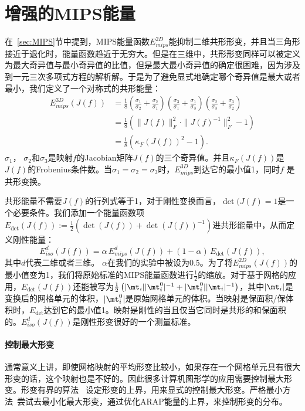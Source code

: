 \section{增强的MIPS能量} \label{sec:AMIPS}
在~\ref{sec:MIPS}节中提到，MIPS能量函数$E_{mips}^{2D}$能抑制二维共形形变，并且当三角形接近于退化时，能量函数趋近于无穷大。但是在三维中，共形形变同样可以被定义为最大奇异值与最小奇异值的比值，但是最大最小奇异值的确定很困难，因为涉及到一元三次多项式方程的解析解。于是为了避免显式地确定哪个奇异值是最大或者最小，我们定义了一个对称式的共形能量：
\begin{align*}\label{MIPS:mips_3D}
E^{3D}_{mips}(J(f)) &=\frac{1}{8}\left(\frac{\sigma_{1}}{\sigma_{2}} + \frac{\sigma_{2}}{\sigma_{1}}\right)\left(\frac{\sigma_{3}}{\sigma_{1}} + \frac{\sigma_{1}}{\sigma_{3}}\right)\left(\frac{\sigma_{2}}{\sigma_{3}} + \frac{\sigma_{3}}{\sigma_{2}}\right)\\
&= \frac{1}{8}\left(\| J(f) \|^2_{F} \cdot \| J(f)^{-1} \|^2_{F} - 1\right) \\
& = \frac{1}{8}(\kappa_F(J(f))^2 -1).
\end{align*}
$\sigma_{1}$， $\sigma_{2}$和$\sigma_{3}$是映射$f$的Jacobian矩阵$J(f)$的三个奇异值。并且$\kappa_F(J(f))$是$J(f)$的Frobenius条件数。当$\sigma_{1}=\sigma_{2}=\sigma_{3}$时，$E^{3D}_{mips}$到达它的最小值1，同时$f$ 是共形变换。

共形能量不需要$J(f)$的行列式等于1，对于刚性变换而言，$\det(J(f) = 1$是一个必要条件。我们添加一个能量函数项$E_{\det}(J(f)) :=\frac{1}{2}(\det(J(f))+\det(J(f))^{-1})$进共形能量中，从而定义刚性能量：
\begin{equation*}
E^{d}_{iso}(J(f)) = \alpha\, E^{d}_{mips}(J(f)) + (1 - \alpha)\, E_{\det}(J(f)),
\end{equation*}
其中$d$代表二维或者三维。 $\alpha$在我们的实验中被设为0.5。为了将$E^{2D}_{mips}(J(f))$的最小值变为1，我们将原始标准的MIPS能量函数进行$\frac{1}{2}$的缩放。对于基于网格的应用，$E_{\det}(J(f))$还能被写为$\frac{1}{2}\left(|\mt_i||\mt^0_i|^{-1} + |\mt^0_i||\mt_i|^{-1}\right)$，其中$|\mt_i|$是变换后的网格单元的体积，$|\mt^0_i|$是原始网格单元的体积。当映射是保面积/保体积时，$E_{\det}$达到它的最小值1。映射是刚性的当且仅当它同时是共形的和保面积的。$E^{d}_{iso}(J(f))$是刚性形变很好的一个测量标准。

\paragraph{控制最大形变}
通常意义上讲，即使网格映射的平均形变比较小，如果存在一个网格单元具有很大形变的话，这个映射也是不好的。因此很多计算机图形学的应用需要控制最大形变。形变有界的算法~\cite{Lipman2012,Aigerman2013,Kovalsky2014,Poranne2014} 设定形变的上界，用来显式的控制最大形变。严格最小方法~\cite{Levi2014}尝试去最小化最大形变，通过优化ARAP能量的上界，来控制形变的分布。

